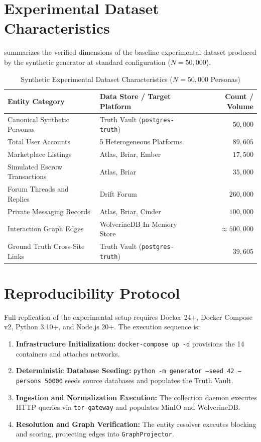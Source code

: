 \section{Experimental Dataset Characteristics}
\label{sec:exp-dataset}
 summarizes the verified dimensions of the baseline experimental dataset produced by the synthetic generator at standard configuration ($N = 50{,}000$).

\begin{table}[htbp]
\centering
\small
\caption{Synthetic Experimental Dataset Characteristics ($N = 50{,}000$ Personas)}
\label{tab:dataset-characteristics}
\begin{tabular}{@{}llr@{}}
\toprule
\textbf{Entity Category} & \textbf{Data Store / Target Platform} & \textbf{Count / Volume} \\ \midrule
Canonical Synthetic Personas & Truth Vault (\texttt{postgres-truth}) & $50{,}000$ \\
Total User Accounts & 5 Heterogeneous Platforms & $89{,}605$ \\
Marketplace Listings & Atlas, Briar, Ember & $17{,}500$ \\
Simulated Escrow Transactions & Atlas, Briar & $35{,}000$ \\
Forum Threads and Replies & Drift Forum & $260{,}000$ \\
Private Messaging Records & Atlas, Briar, Cinder & $100{,}000$ \\
Interaction Graph Edges & WolverineDB In-Memory Store & $\approx 500{,}000$ \\
Ground Truth Cross-Site Links & Truth Vault (\texttt{postgres-truth}) & $39{,}605$ \\ \bottomrule
\end{tabular}
\end{table}

\section{Reproducibility Protocol}
\label{sec:exp-reproducibility}
Full replication of the experimental setup requires Docker 24+, Docker Compose v2, Python 3.10+, and Node.js 20+. The execution sequence is:
\begin{enumerate}
    \item \textbf{Infrastructure Initialization:} \texttt{docker-compose up -d} provisions the 14 containers and attaches networks.
    \item \textbf{Deterministic Database Seeding:} \texttt{python -m generator --seed 42 --persons 50000} seeds source databases and populates the Truth Vault.
    \item \textbf{Ingestion and Normalization Execution:} The collection daemon executes HTTP queries via \texttt{tor-gateway} and populates MinIO and WolverineDB.
    \item \textbf{Resolution and Graph Verification:} The entity resolver executes blocking and scoring, projecting edges into \texttt{GraphProjector}.
\end{enumerate}

